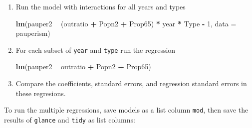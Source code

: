 \documentclass[]{article}
\newenvironment{Shaded}{\begin{snugshade}}{\end{snugshade}}
\newcommand{\KeywordTok}[1]{\textcolor[rgb]{0.13,0.29,0.53}{\textbf{#1}}}
\newcommand{\DataTypeTok}[1]{\textcolor[rgb]{0.13,0.29,0.53}{#1}}
\newcommand{\DecValTok}[1]{\textcolor[rgb]{0.00,0.00,0.81}{#1}}
\newcommand{\StringTok}[1]{\textcolor[rgb]{0.31,0.60,0.02}{#1}}
\newcommand{\ControlFlowTok}[1]{\textcolor[rgb]{0.13,0.29,0.53}{\textbf{#1}}}
\newcommand{\OperatorTok}[1]{\textcolor[rgb]{0.81,0.36,0.00}{\textbf{#1}}}
\newcommand{\NormalTok}[1]{#1}
\begin{document}
\begin{enumerate}
\def\labelenumi{\arabic{enumi}.}
\item
  Run the model with interactions for all years and types

\begin{Shaded}
\begin{Highlighting}[]
\KeywordTok{lm}\NormalTok{(pauper2 }\OperatorTok{~}\StringTok{ }\NormalTok{(outratio }\OperatorTok{+}\StringTok{ }\NormalTok{Popn2 }\OperatorTok{+}\StringTok{ }\NormalTok{Prop65) }\OperatorTok{*}\StringTok{ }\NormalTok{year }\OperatorTok{*}\StringTok{ }\NormalTok{Type }\OperatorTok{-}\StringTok{ }\DecValTok{1}\NormalTok{, }\DataTypeTok{data =}\NormalTok{ pauperism)}
\end{Highlighting}
\end{Shaded}
\item
  For each subset of \texttt{year} and \texttt{type} run the regression

\begin{Shaded}
\begin{Highlighting}[]
\KeywordTok{lm}\NormalTok{(pauper2 }\OperatorTok{~}\StringTok{ }\NormalTok{outratio }\OperatorTok{+}\StringTok{ }\NormalTok{Popn2 }\OperatorTok{+}\StringTok{ }\NormalTok{Prop65)}
\end{Highlighting}
\end{Shaded}
\item
  Compare the coefficients, standard errors, and regression standard
  errors in these regresions.
\end{enumerate}

To run the multiple regressions, save models as a list column
\texttt{mod}, then save the results of \texttt{glance} and \texttt{tidy}
as list columns:

\begin{Shaded}
\end{Shaded}
\end{document}
